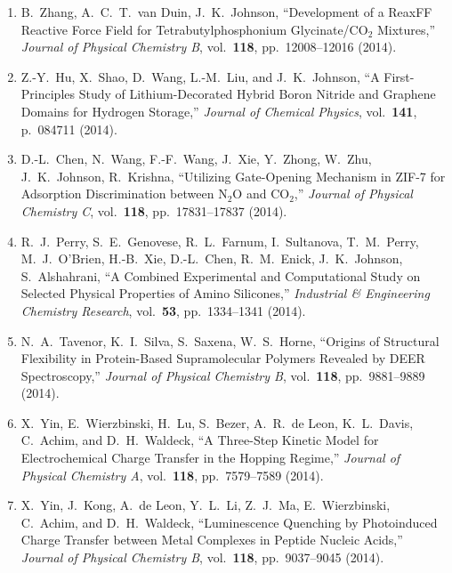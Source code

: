 \begin{enumerate}
\item B.\ Zhang, A.\ C.\ T.\ van Duin, J.\ K.\ Johnson, ``Development
  of a ReaxFF Reactive Force Field for Tetrabutylphosphonium
  Glycinate/$\mathrm{CO}_2$ Mixtures,'' \textit{Journal of Physical
    Chemistry B}, vol.\ \textbf{118}, pp.\ 12008--12016 (2014).

\item Z.-Y.\ Hu, X.\ Shao, D.\ Wang, L.-M.\ Liu, and J.\ K.\ Johnson,
  ``A First-Principles Study of Lithium-Decorated Hybrid Boron Nitride
  and Graphene Domains for Hydrogen Storage,'' \textit{Journal of
    Chemical Physics}, vol.\ \textbf{141}, p.\ 084711 (2014).

\item D.-L.\ Chen, N.\ Wang, F.-F.\ Wang, J.\ Xie, Y.\ Zhong, W.\ Zhu,
  J.\ K.\ Johnson, R.\ Krishna, ``Utilizing Gate-Opening Mechanism in
  ZIF-7 for Adsorption Discrimination between $\mathrm{N}_2\mathrm{O}$
  and $\mathrm{CO}_2$,'' \textit{Journal of Physical Chemistry C},
  vol.\ \textbf{118}, pp.\ 17831--17837 (2014).

\item R.\ J.\ Perry, S.\ E.\ Genovese, R.\ L.\ Farnum, I.\ Sultanova,
  T.\ M.\ Perry, M.\ J.\ O'Brien, H.-B.\ Xie, D.-L.\ Chen,
  R.\ M.\ Enick, J.\ K.\ Johnson, S.\ Alshahrani, ``A Combined
  Experimental and Computational Study on Selected Physical Properties
  of Amino Silicones,'' \textit{Industrial \& Engineering Chemistry
    Research}, vol.\ \textbf{53}, pp.\ 1334--1341 (2014).

\item N.\ A.\ Tavenor, K.\ I.\ Silva, S.\ Saxena, W.\ S.\ Horne,
  ``Origins of Structural Flexibility in Protein-Based Supramolecular
  Polymers Revealed by DEER Spectroscopy,'' \textit{Journal of
    Physical Chemistry B}, vol.\ \textbf{118}, pp.\ 9881--9889 (2014).

\item X.\ Yin, E.\ Wierzbinski, H.\ Lu, S.\ Bezer, A.\ R.\ de Leon,
  K.\ L.\ Davis, C.\ Achim, and D.\ H.\ Waldeck, ``A Three-Step
  Kinetic Model for Electrochemical Charge Transfer in the Hopping
  Regime,'' \textit{Journal of Physical Chemistry A},
  vol.\ \textbf{118}, pp.\ 7579--7589 (2014).

\item X.\ Yin, J.\ Kong, A.\ de Leon, Y.\ L.\ Li, Z.\ J.\ Ma,
  E.\ Wierzbinski, C.\ Achim, and D.\ H.\ Waldeck, ``Luminescence
  Quenching by Photoinduced Charge Transfer between Metal Complexes in
  Peptide Nucleic Acids,'' \textit{Journal of Physical Chemistry B},
  vol.\ \textbf{118}, pp.\ 9037--9045 (2014).


\end{enumerate}

